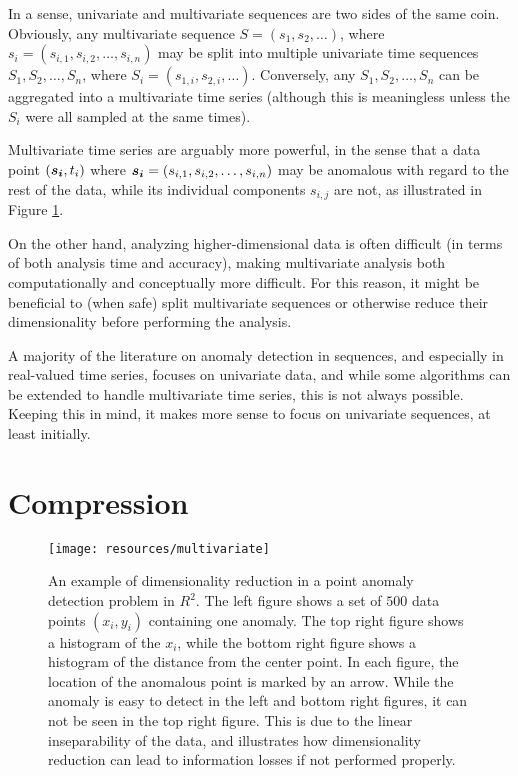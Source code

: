In a sense, univariate and multivariate sequences are two sides of the same coin. Obviously, any multivariate sequence $S = (s_1, s_2, \dots)$, where $s_i = (s_{i,1}, s_{i,2}, \dots, s_{i,n})$ may be split into multiple univariate time sequences $S_1, S_2, \dots, S_n$, where $S_i = (s_{1,i}, s_{2, i}, \dots ).$ Conversely, any $S_1, S_2, \dots, S_n$ can be aggregated into a multivariate time series (although this is meaningless unless the $S_i$ were all sampled at the same times).

Multivariate time series are arguably more powerful, in the sense that a data point $(\boldsymbol{s_i}, t_i)$ where $\boldsymbol{s_i} = (s_{i,1}, s_{i,2}, \dots, s_{i,n})$ may be anomalous with regard to the rest of the data, while its individual components $s_{i,j}$ are not, as illustrated in Figure \ref{fig:dimensionality_reduction}.

On the other hand, analyzing higher-dimensional data is often difficult (in terms of both analysis time and accuracy), making multivariate analysis both computationally and conceptually more difficult. For this reason, it might be beneficial to (when safe) split multivariate sequences or otherwise reduce their dimensionality before performing the analysis. 

A majority of the literature on anomaly detection in sequences, and especially in real-valued time series, focuses on univariate data, and while some algorithms can be extended to handle multivariate time series, this is not always possible. Keeping this in mind, it makes more sense to focus on univariate sequences, at least initially.

\section{Compression}
\label{sect:compression}

\begin{figure}[htb]
\begin{center}
\leavevmode
\texttt{[image: resources/multivariate]}
\end{center}
\caption{\small{An example of dimensionality reduction in a point anomaly detection problem in $R^2$. The left figure shows a set of $500$ data points $(x_i, y_i)$ containing one anomaly. The top right figure shows a histogram of the $x_i$, while the bottom right figure shows a histogram of the distance from the center point. In each figure, the location of the anomalous point is marked by an arrow. While the anomaly is easy to detect in the left and bottom right figures, it can not be seen in the top right figure. This is due to the linear inseparability of the data, and illustrates how dimensionality reduction can lead to information losses if not performed properly.}}
\label{fig:dimensionality_reduction}
\end{figure}

